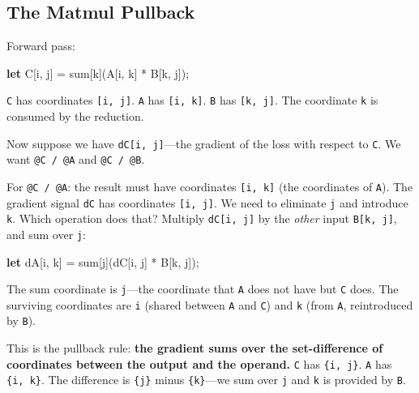 \documentclass[11pt,]{article}
\newenvironment{Shaded}{}{}
\newcommand{\KeywordTok}[1]{\textcolor[rgb]{0.00,0.44,0.13}{\textbf{#1}}}
\newcommand{\NormalTok}[1]{#1}
\newcommand{\OperatorTok}[1]{\textcolor[rgb]{0.40,0.40,0.40}{#1}}
\begin{document}
\hypertarget{the-matmul-pullback}{%
\subsection{The Matmul Pullback}\label{the-matmul-pullback}}

Forward pass:

\begin{Shaded}
\begin{Highlighting}[]
\KeywordTok{let}\NormalTok{ C}\OperatorTok{[}\NormalTok{i, j}\OperatorTok{]}\NormalTok{ = sum}\OperatorTok{[}\NormalTok{k}\OperatorTok{]}\NormalTok{(A}\OperatorTok{[}\NormalTok{i, k}\OperatorTok{]}\NormalTok{ * B}\OperatorTok{[}\NormalTok{k, j}\OperatorTok{]}\NormalTok{);}
\end{Highlighting}
\end{Shaded}

\texttt{C} has coordinates \texttt{{[}i,\ j{]}}. \texttt{A} has
\texttt{{[}i,\ k{]}}. \texttt{B} has \texttt{{[}k,\ j{]}}. The
coordinate \texttt{k} is consumed by the reduction.

Now suppose we have \texttt{dC{[}i,\ j{]}}---the gradient of the loss
with respect to \texttt{C}. We want \texttt{@C\ /\ @A} and
\texttt{@C\ /\ @B}.

For \texttt{@C\ /\ @A}: the result must have coordinates
\texttt{{[}i,\ k{]}} (the coordinates of \texttt{A}). The gradient
signal \texttt{dC} has coordinates \texttt{{[}i,\ j{]}}. We need to
eliminate \texttt{j} and introduce \texttt{k}. Which operation does
that? Multiply \texttt{dC{[}i,\ j{]}} by the \emph{other} input
\texttt{B{[}k,\ j{]}}, and sum over \texttt{j}:

\begin{Shaded}
\begin{Highlighting}[]
\KeywordTok{let}\NormalTok{ dA}\OperatorTok{[}\NormalTok{i, k}\OperatorTok{]}\NormalTok{ = sum}\OperatorTok{[}\NormalTok{j}\OperatorTok{]}\NormalTok{(dC}\OperatorTok{[}\NormalTok{i, j}\OperatorTok{]}\NormalTok{ * B}\OperatorTok{[}\NormalTok{k, j}\OperatorTok{]}\NormalTok{);}
\end{Highlighting}
\end{Shaded}

The sum coordinate is \texttt{j}---the coordinate that \texttt{A} does
not have but \texttt{C} does. The surviving coordinates are \texttt{i}
(shared between \texttt{A} and \texttt{C}) and \texttt{k} (from
\texttt{A}, reintroduced by \texttt{B}).

This is the pullback rule: \textbf{the gradient sums over the
set-difference of coordinates between the output and the operand.}
\texttt{C} has \texttt{\{i,\ j\}}. \texttt{A} has \texttt{\{i,\ k\}}.
The difference is \texttt{\{j\}} minus \texttt{\{k\}}---we sum over
\texttt{j} and \texttt{k} is provided by \texttt{B}.
\end{document}
